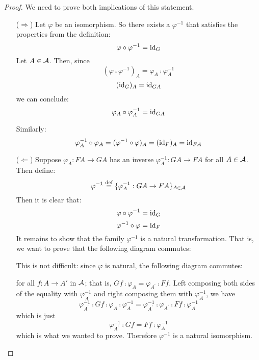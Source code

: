 \begin{proof}
We need to prove both implications of this statement.

\begin{itemize}

\item[($\Rightarrow$)] Let $\varphi$ be an isomorphism. So there exists a
$\varphi^{-1}$ that satisfies the properties from the definition:
\[ \varphi \circ \varphi^{-1} = \mathrm{id}_{ G } \]
Let $A \in \mathcal{A}$. Then, since
\[ (\varphi \comp \varphi^{-1})_A = \varphi_A \comp \varphi_A^{-1} \]
\[ ( \mathrm{id}_{ G } )_A = \mathrm{id}_{ GA } \]
we can conclude:
\[ \varphi_A \circ \varphi_A^{-1} = \mathrm{id}_{ GA } \]

Similarly:
\[ \varphi_A^{-1} \circ \varphi_A = (\varphi^{-1} \circ \varphi)_A = (\mathrm{id}_{ F })_A
= \mathrm{id}_{ FA } \]

\item[($\Leftarrow$)] Suppose $\varphi_A: FA \to GA$ has an inverse
$\varphi_A^{-1}: GA \to FA$ for all $A \in \mathcal{A}$. Then define:
\[ \varphi^{-1} \stackrel{\text{def}}{=} \{ \varphi_A^{-1}: GA \to FA \}_{A\in\mathcal{A}} \]
Then it is clear that:
\[ \varphi \circ \varphi^{-1} = \mathrm{id}_{ G } \]
\[ \varphi^{-1} \circ \varphi = \mathrm{id}_{ F } \]
It remains to show that the family $\varphi^{-1}$ is a natural transformation.
That is, we want to prove that the following diagram commutes:

\begin{center}
\end{center}

This is not difficult: since $\varphi$ is natural, the following diagram
commutes:
\begin{center}
\end{center}
for all $f:A\to A'$ in $\mathcal{A}$;
that is, $Gf \comp \varphi_A = \varphi_{A^{\prime}} \comp Ff$. Left composing
both sides of the equality with $\varphi_{A^{\prime}}^{-1}$ and right composing
them with $\varphi_{A}^{-1}$, we have
\[ \varphi_{A^{\prime}}^{-1} \comp Gf \comp \varphi_A \comp \varphi_A^{-1} =
\varphi_{A^{\prime}}^{-1} \comp \varphi_{A^{\prime}} \comp Ff
\comp \varphi_A^{-1} \]
which is just
\[ \varphi_{A^{\prime}}^{-1} \comp Gf = Ff \comp \varphi_A^{-1} \]
which is what we wanted to prove. Therefore $\varphi^{-1}$ is a natural
isomorphism.

\end{itemize}
\end{proof}

